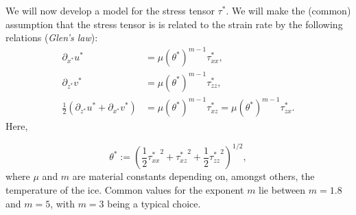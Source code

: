 We will now develop a model for the stress tensor $\tau^*$. We will make the (common) assumption that the stress tensor is is related to the strain rate by the following relations (\textit{Glen's law}):
%
\begin{equation*}
  \begin{split}
    \partial_{x^*} u^* &= \mu(\theta^*)^{m-1} \tau_{xx}^*, \\
    \partial_{z^*} v^* &= \mu(\theta^*)^{m-1} \tau_{zz}^*, \\
    \frac{1}{2}(\partial_{z^*} u^* + \partial_{x^*} v^*) &= \mu(\theta^*)^{m-1} \tau_{xz}^* = \mu(\theta^*)^{m-1} \tau_{zx}^*.
  \end{split}
\end{equation*}
%
Here,

\begin{equation} \label{eq:theta}
  \theta^* := \left( \frac{1}{2} {\tau_{xx}^*}^2 + {\tau_{xz}^*}^2 + \frac{1}{2} {\tau_{zz}^*}^2 \right) ^{1/2},
\end{equation}
%
where $\mu$ and $m$ are material constants depending on, amongst others, the temperature of the ice. Common values for the exponent $m$ lie between $m = 1.8$ and $m = 5$, with $m = 3$ being a typical choice.


